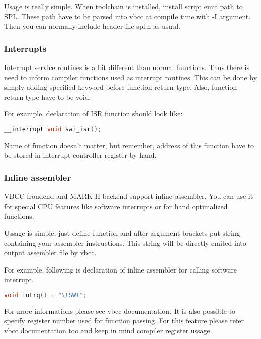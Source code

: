 Usage is really simple. When toolchain is installed, install script emit path to
SPL. These path have to be parsed into vbcc at compile time with -I argument.
Then you can normally include header file spl.h as usual.

\subsubsection{Interrupts}

Interrupt service routines is a bit different than normal functions. Thus there is
need to inform compiler functions used as interrupt routines. This can be done by
simply adding specified keyword before function return type. Also, function return
type have to be void. 

For example, declaration of ISR function should look like:

\begin{lstlisting}[language={C}, frame=single]
    __interrupt void swi_isr();
\end{lstlisting}

Name of function doesn't matter, but remember, address of this function have to be 
stored in interrupt controller register by hand. 

\subsubsection{Inline assembler}

VBCC frondend and MARK-II backend support inline assembler. You can use it for
special CPU features like software interrupts or for hand optimalized functions.

Ussage is simple, just define function and after argument brackets put string
containing your assembler instructions. This string will be directly emited into
output assembler file by vbcc.

For example, following is declaration of inline assembler for calling software interrupt.

\begin{lstlisting}[language={C}, frame=single]
    void intrq() = "\tSWI";
\end{lstlisting}

For more informations please see vbcc documentation. It is also possible to specify 
register number used for function passing. For this feature please refer vbcc documentation
too and keep in mind compiler register ussage.
